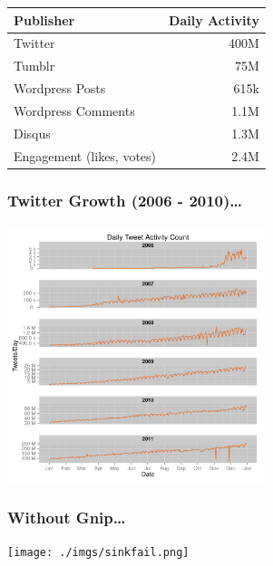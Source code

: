 \documentclass{beamer}
\begin{document}
\begin{frame} 
\begin{table}
\begin{tabular}{l|r}
\hline
   {Publisher}   &   {Daily Activity}   \\
\hline 
    Twitter      &      400M   \\
    Tumblr      &        75M   \\
    Wordpress Posts &     615k   \\
    Wordpress Comments & 1.1M \\
    Disqus       &       1.3M  \\
    Engagement (likes, votes) & 2.4M  \\
\hline
\end{tabular}
\end{table}
\end{frame}


\begin{frame}\frametitle{Twitter Growth (2006 - 2010)\ldots}
  \begin{center}
    \includegraphics[width=7.5cm]{./imgs/TweetCount_byDay.pdf}
  \end{center}
\end{frame}



\begin{frame}\frametitle{Without Gnip\ldots}
  \begin{center}
    \texttt{[image: ./imgs/sinkfail.png]}
  \end{center}
\end{frame}

\end{document}
